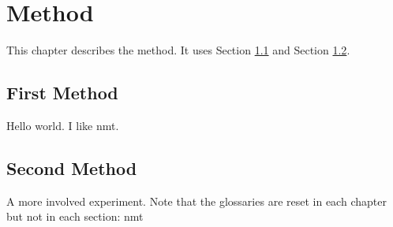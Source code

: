 \chapter{Method}%
\label{chap:method}

This chapter describes the method. It uses Section \ref{sec:method1} and
Section \ref{sec:method2}.


\section{First Method}
\label{sec:method1}

Hello world. I like \ac{nmt}.

\section{Second Method}
\label{sec:method2}

A more involved experiment. Note that the glossaries are reset in each chapter
but not in each section: \ac{nmt}
